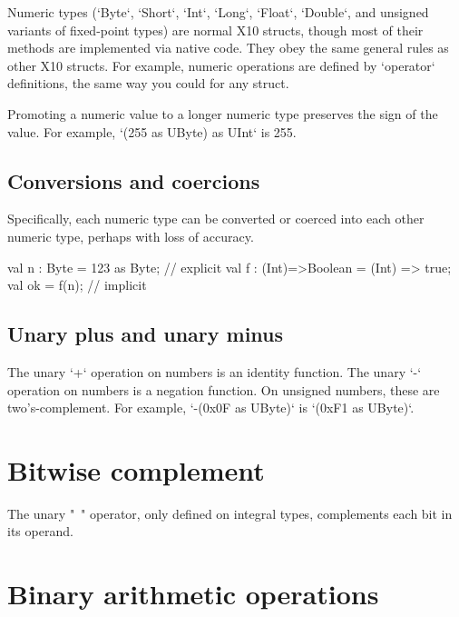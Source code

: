 Numeric types (\xcd`Byte`, \xcd`Short`, \xcd`Int`, \xcd`Long`, \xcd`Float`,
\xcd`Double`, and unsigned variants of fixed-point types) are normal X10
structs, though most of their methods are implemented via native code. They
obey the same general rules as other X10 structs. For example, numeric
operations are defined by \xcd`operator` definitions, the same way you could
for any struct.

Promoting a numeric value to a longer numeric type preserves the sign of the
value.  For example, \xcd`(255 as UByte) as UInt` is 255.  

\subsection{Conversions and coercions}

Specifically, each numeric type can be converted or coerced into each other
numeric type, perhaps with loss of accuracy.
\begin{xten}
val n : Byte = 123 as Byte; // explicit 
val f : (Int)=>Boolean = (Int) => true; 
val ok = f(n); // implicit
\end{xten}



\subsection{Unary plus and unary minus}

The unary \xcd`+` operation on numbers is an identity function.
The unary \xcd`-` operation on numbers is a negation function.
On unsigned numbers, these are two's-complement.  For example, 
\xcd`-(0x0F as UByte)` is 
\xcd`(0xF1 as UByte)`.



\section{Bitwise complement}

The unary \xcd"~" operator, only defined on integral types, complements each
bit in its operand.  

\section{Binary arithmetic operations} 

